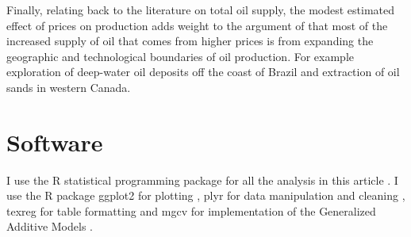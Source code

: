 \documentclass[11pt]{article}
\begin{document}
Finally, relating back to the literature on total oil supply, the modest estimated effect of prices on production adds weight to the argument of \citet{hamilton_oil_2012} that most of the increased supply of oil that comes from higher prices is from expanding the geographic and technological boundaries of oil production.  For example exploration of deep-water oil deposits off the coast of Brazil and extraction of oil sands in western Canada.



\FloatBarrier
\section{Software}
I use the R statistical programming package for all the analysis in this article \citep{r_core_team_r:_2013}.  I use the R package ggplot2 for plotting \citep{wickham_ggplot2:_2009}, plyr for data manipulation and cleaning \citep{wickham_split-apply-combine_2011}, texreg for table formatting \citep{leifeld_texreg:_2013} and mgcv for implementation of the Generalized Additive Models \citep{wood_fast_2011}.



\end{document}
